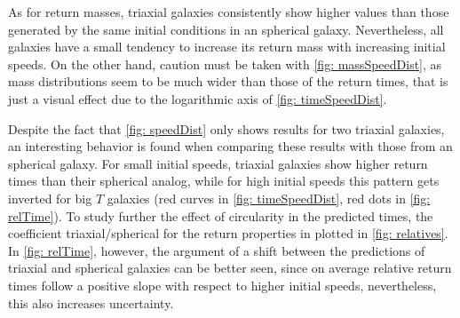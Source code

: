 	As for return masses, triaxial galaxies consistently show higher values than those generated by the same initial conditions in an spherical galaxy. Nevertheless, all galaxies have a small tendency to increase its return mass with increasing initial speeds. On the other hand, caution must be taken with \autoref{fig: massSpeedDist}, as mass distributions seem to be much wider than those of the return times, that is just a visual effect due to the logarithmic axis of \autoref{fig: timeSpeedDist}. 
	
	Despite the fact that \autoref{fig: speedDist} only shows results for two triaxial galaxies, an interesting behavior is found when comparing these results with those from an spherical galaxy. For small initial speeds, triaxial galaxies show higher return times than their spherical analog, while for high initial speeds this pattern gets inverted for big $T$ galaxies (red curves in \autoref{fig: timeSpeedDist}, red dots in \autoref{fig: relTime}). To study further the effect of circularity in the predicted times, the coefficient triaxial/spherical for the return properties in plotted in \autoref{fig: relatives}. In \autoref{fig: relTime}, however, the argument of a shift between the predictions of triaxial and spherical galaxies can be better seen, since on average relative return times follow a positive slope with respect to higher initial speeds, nevertheless, this also increases uncertainty.
